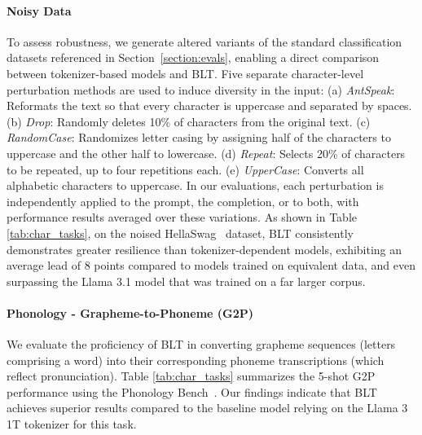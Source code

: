 \paragraph{Noisy Data} To assess robustness, we generate altered variants of the standard classification datasets referenced in Section~\ref{section:evals}, enabling a direct comparison between tokenizer-based models and {\textsc BLT}. Five separate character-level perturbation methods are used to induce diversity in the input: (a) \textit{AntSpeak}: Reformats the text so that every character is uppercase and separated by spaces. (b) \textit{Drop}: Randomly deletes 10\% of characters from the original text. (c) \textit{RandomCase}: Randomizes letter casing by assigning half of the characters to uppercase and the other half to lowercase. (d) \textit{Repeat}: Selects 20\% of characters to be repeated, up to four repetitions each. (e) \textit{UpperCase}: Converts all alphabetic characters to uppercase. In our evaluations, each perturbation is independently applied to the prompt, the completion, or to both, with performance results averaged over these variations. As shown in Table \ref{tab:char_tasks}, on the noised HellaSwag~\citep{Eval_hellaswag} dataset, {\textsc BLT} consistently demonstrates greater resilience than tokenizer-dependent models, exhibiting an average lead of 8 points compared to models trained on equivalent data, and even surpassing the Llama 3.1 model that was trained on a far larger corpus.

\paragraph{Phonology - Grapheme-to-Phoneme (G2P)} We evaluate the proficiency of {\textsc BLT} in converting grapheme sequences (letters comprising a word) into their corresponding phoneme transcriptions (which reflect pronunciation). Table \ref{tab:char_tasks} summarizes the 5-shot G2P performance using the Phonology Bench~\citep{suvarna2024phonologybench}. Our findings indicate that {\textsc BLT} achieves superior results compared to the baseline model relying on the Llama 3 1T tokenizer for this task.

